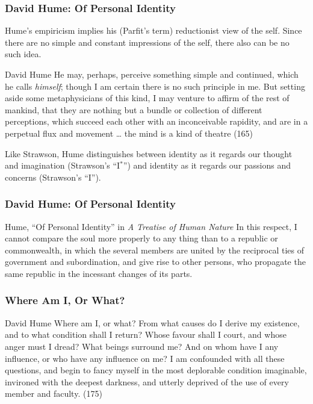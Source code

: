 \documentclass[xcolor=dvipsnames]{beamer}
\begin{document}
\begin{frame}
  \frametitle{David Hume: Of Personal Identity}
  Hume's empiricism implies his (Parfit's term) reductionist view
  of the self. Since there are no simple and constant impressions
  of the self, there also can be no such idea.
  \begin{block}{David Hume}
    He may, perhaps, perceive something simple and continued,
    which he calls \emph{himself}; though I am certain there is no
    such principle in me. But setting aside some metaphysicians of
    this kind, I may venture to affirm of the rest of mankind,
    that they are nothing but a bundle or collection of different
    perceptions, which succeed each other with an inconceivable
    rapidity, and are in a perpetual flux and movement {\ldots}
    the mind is a kind of theatre (165)
  \end{block}
Like Strawson, Hume distinguishes between identity as it regards
our thought and imagination (Strawson's ``I$^{\ast}$'') and identity
as it regards our passions and concerns (Strawson's ``I''). 
\end{frame}

\begin{frame}
  \frametitle{David Hume: Of Personal Identity}
  \begin{block}{Hume, ``Of Personal Identity'' in \emph{A Treatise of Human Nature}}
    In this respect, I cannot compare the soul more properly to any
    thing than to a republic or commonwealth, in which the several
    members are united by the reciprocal ties of government and
    subordination, and give rise to other persons, who propagate the
    same republic in the incessant changes of its parts.
  \end{block}
\end{frame}

\begin{frame}
  \frametitle{Where Am I, Or What?}
  \begin{block}{David Hume}
    Where am I, or what? From what causes do I derive my
    existence, and to what condition shall I return? Whose favour
    shall I court, and whose anger must I dread? What beings
    surround me? And on whom have I any influence, or who have
    any influence on me? I am confounded with all these questions,
    and begin to fancy myself in the most deplorable condition
    imaginable, invironed with the deepest darkness, and utterly
    deprived of the use of every member and faculty. (175)
  \end{block}
\end{frame}
\end{document}
